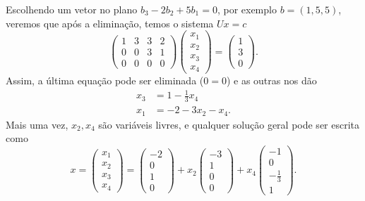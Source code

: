 Escolhendo um vetor no plano $b_3-2b_2+5b_1=0$, por exemplo $b=(1,5,5)$, veremos que após a eliminação, temos o sistema $Ux=c$
\begin{equation*}
   \begin{pmatrix}
      1 & 3 & 3 & 2\\
      0 & 0 & 3 & 1\\
      0 & 0 & 0 & 0
   \end{pmatrix}
   \begin{pmatrix}
      x_1\\
      x_2\\
      x_3\\
      x_4
   \end{pmatrix}
   =
   \begin{pmatrix}
      1 \\
      3\\
      0
   \end{pmatrix}.
\end{equation*}
Assim, a última equação pode ser eliminada ($0=0$) e as outras nos dão
\begin{align*}
  x_3 &= 1-\frac{1}{3}x_4\\
  x_1 &= -2 - 3x_2 -x_4.
\end{align*}
Mais uma vez, $x_2,x_4$ são variáveis livres, e qualquer solução geral pode ser escrita como
\begin{equation*}
  x = 
    \begin{pmatrix}
      x_1\\
      x_2\\
      x_3\\
      x_4
    \end{pmatrix}
    =
    \begin{pmatrix}
      -2\\
      0\\
      1\\
      0
    \end{pmatrix}
    + x_2
    \begin{pmatrix}
      -3\\
      1\\
      0\\
      0
    \end{pmatrix}
    + x_4
    \begin{pmatrix}
      -1\\
      0\\
      -\frac{1}{3}\\
      1
    \end{pmatrix}.
\end{equation*}
